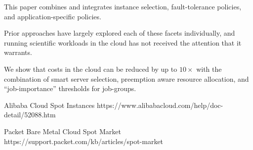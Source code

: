 

This paper combines and integrates instance selection, fault-tolerance policies, and application-specific policies.

Prior approaches have largely explored each of these facets individually, and running scientific workloads in the cloud has not received the attention that it warrants.

We show that costs in the cloud can be reduced by up to $10\times$ with the combination of smart server selection, preemption aware resource allocation, and ``job-importance'' thresholds for job-groups.





Alibaba Cloud Spot Instances 
https://www.alibabacloud.com/help/doc-detail/52088.htm

Packet Bare Metal Cloud Spot Market
https://support.packet.com/kb/articles/spot-market


